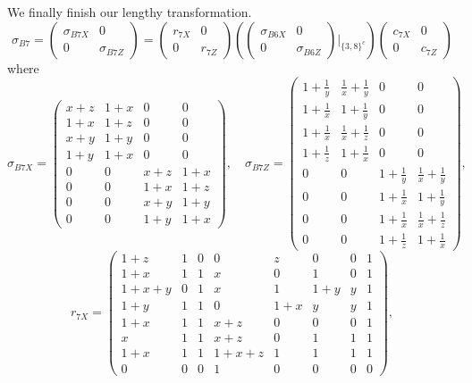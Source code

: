 We finally finish our lengthy transformation.
\[
 \sigma_{B7} =
 \begin{pmatrix} \sigma_{B7X} & 0 \\ 0 & \sigma_{B7Z} \end{pmatrix}
=
\begin{pmatrix} r_{7X} & 0 \\ 0 & r_{7Z} \end{pmatrix}
\left( \begin{pmatrix} \sigma_{B6X} & 0 \\ 0 & \sigma_{B6Z} \end{pmatrix}\rvert_{\{3,8\}^c} \right)
\begin{pmatrix} c_{7X} & 0 \\ 0 & c_{7Z} \end{pmatrix}
\]
where
\[
 \sigma_{B7X} =
\left(\begin{array}{cccc}
 x+z & 1+x & 0 & 0 \\
 1+x & 1+z & 0 & 0 \\
 x+y & 1+y & 0 & 0 \\
 1+y & 1+x & 0 & 0 \\
 0 & 0 & x+z & 1+x \\
 0 & 0 & 1+x & 1+z \\
 0 & 0 & x+y & 1+y \\
 0 & 0 & 1+y & 1+x
\end{array}\right), \quad
\sigma_{B7Z} =
\left(\begin{array}{cccc}
 1+\frac{1}{y} & \frac{1}{x}+\frac{1}{y} & 0 & 0 \\
 1+\frac{1}{x} & 1+\frac{1}{y} & 0 & 0 \\
 1+\frac{1}{x} & \frac{1}{x}+\frac{1}{z} & 0 & 0 \\
 1+\frac{1}{z} & 1+\frac{1}{x} & 0 & 0 \\
 0 & 0 & 1+\frac{1}{y} & \frac{1}{x}+\frac{1}{y} \\
 0 & 0 & 1+\frac{1}{x} & 1+\frac{1}{y} \\
 0 & 0 & 1+\frac{1}{x} & \frac{1}{x}+\frac{1}{z} \\
 0 & 0 & 1+\frac{1}{z} & 1+\frac{1}{x}
\end{array}\right),
\]
\[
 r_{7X} =
\left(\begin{array}{cccccccc}
 1+z & 1 & 0 & 0 & z & 0 & 0 & 1 \\
 1+x & 1 & 1 & x & 0 & 1 & 0 & 1 \\
 1+x+y & 0 & 1 & x & 1 & 1+y & y & 1 \\
 1+y & 1 & 1 & 0 & 1+x & y & y & 1 \\
 1+x & 1 & 1 & x+z & 0 & 0 & 0 & 1 \\
 x & 1 & 1 & x+z & 0 & 1 & 1 & 1 \\
 1+x & 1 & 1 & 1+x+z & 1 & 1 & 1 & 1 \\
 0 & 0 & 0 & 1 & 0 & 0 & 0 & 0
\end{array}\right),
\]
